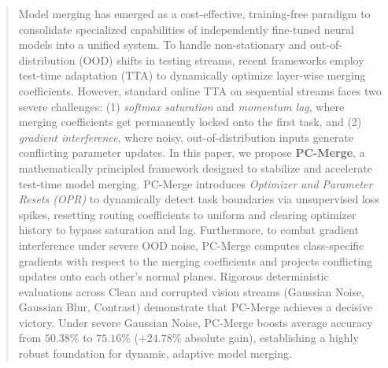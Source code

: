 \documentclass{article}
\theoremstyle{plain}
\theoremstyle{definition}
\theoremstyle{remark}
\begin{document}

\begin{abstract}
Model merging has emerged as a cost-effective, training-free paradigm to consolidate specialized capabilities of independently fine-tuned neural models into a unified system. To handle non-stationary and out-of-distribution (OOD) shifts in testing streams, recent frameworks employ test-time adaptation (TTA) to dynamically optimize layer-wise merging coefficients. However, standard online TTA on sequential streams faces two severe challenges: (1) \emph{softmax saturation} and \emph{momentum lag}, where merging coefficients get permanently locked onto the first task, and (2) \emph{gradient interference}, where noisy, out-of-distribution inputs generate conflicting parameter updates. In this paper, we propose \textbf{PC-Merge}, a mathematically principled framework designed to stabilize and accelerate test-time model merging. PC-Merge introduces \emph{Optimizer and Parameter Resets (OPR)} to dynamically detect task boundaries via unsupervised loss spikes, resetting routing coefficients to uniform and clearing optimizer history to bypass saturation and lag. Furthermore, to combat gradient interference under severe OOD noise, PC-Merge computes class-specific gradients with respect to the merging coefficients and projects conflicting updates onto each other's normal planes. Rigorous deterministic evaluations across Clean and corrupted vision streams (Gaussian Noise, Gaussian Blur, Contrast) demonstrate that PC-Merge achieves a decisive victory. Under severe Gaussian Noise, PC-Merge boosts average accuracy from $50.38\%$ to $\mathbf{75.16\%}$ ($+24.78\%$ absolute gain), establishing a highly robust foundation for dynamic, adaptive model merging.
\end{abstract}
\end{document}
